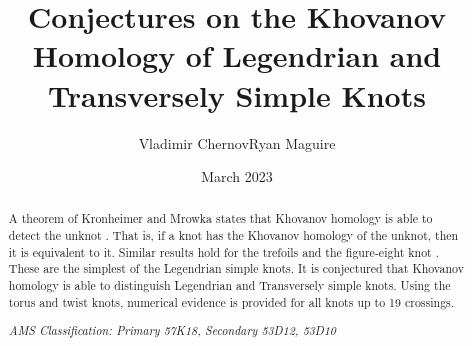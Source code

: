 \documentclass{article}
\title{Conjectures on the Khovanov Homology of Legendrian and Transversely Simple Knots}
\author{Vladimir Chernov\hspace{2em}Ryan Maguire}
\date{March 2023}
\theoremstyle{plain}
\begin{document}
    \maketitle
    \tableofcontents
    \begin{abstract}
        \noindent
        A theorem of Kronheimer and Mrowka states that Khovanov homology is
        able to detect the unknot \cite{kronheimermrowka2010}.
        That is, if a knot has the Khovanov homology of the unknot, then it is
        equivalent to it. Similar results hold for the trefoils
        \cite{BaldwinSivekKhovanovTrefoils} and the figure-eight knot
        \cite{BaldwinDowlinKhovanovFigureEight}. These are the
        simplest of the Legendrian simple knots. It is conjectured that
        Khovanov homology is able to distinguish Legendrian and Transversely simple
        knots. Using the torus and twist knots, numerical evidence is provided
        for all knots up to 19 crossings.
        \par\hfill\par
        \textit{AMS Classification: Primary 57K18, Secondary 53D12, 53D10}
    \end{abstract}
\end{document}

